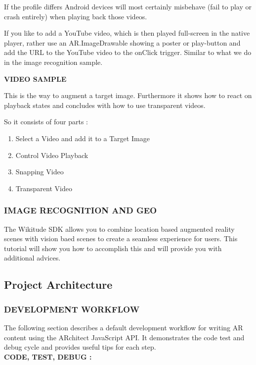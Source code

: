 \documentclass{article}
\begin{document}
\par If the profile differs Android devices will most certainly misbehave (fail to play or crash entirely) when playing back those videos. 
\par If you like to add a YouTube video, which is then played full-screen in the native player, rather use an AR.ImageDrawable showing a poster or play-button and add the URL to the YouTube video to the onClick trigger. Similar to what we do in the image recognition sample.\\[.4cm]
\par \textbf{VIDEO SAMPLE }\\
\fi


\par This is the way to augment a target image. Furthermore it shows how to react on playback states and concludes with how to use transparent videos. 
\par So it consists of four parts :
\begin{enumerate}
\item Select a Video and add it to a Target Image 
\item Control Video Playback 
\item  Snapping Video 
\item Transparent Video 
\end{enumerate}

\subsubsection{IMAGE RECOGNITION AND GEO }
\par The Wikitude SDK allows you to combine location based augmented reality scenes with vision baed scenes to create a seamless experience for users. This tutorial will show you how to accomplish this and will provide you with additional advices. 

\subsection{ Project Architecture }
\subsubsection{DEVELOPMENT WORKFLOW }
\par The following section describes a default development workflow for writing AR content using the ARchitect JavaScript API. It demonstrates the code test and debug cycle and provides useful tips for each step. \\
\textbf{CODE, TEST, DEBUG :}
\end{document}
